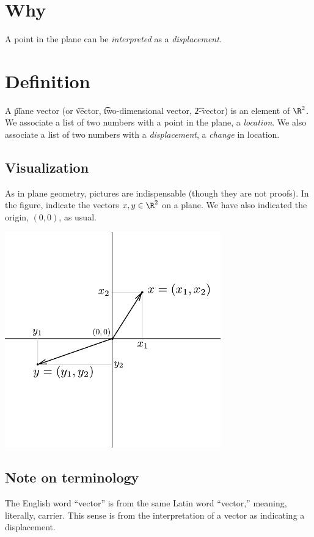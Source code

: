 
\section*{Why}

A point in the plane can be \textit{interpreted} as a \textit{displacement}.

\section*{Definition}

A \t{plane vector} (or \t{vector}, \t{two-dimensional vector}, \t{2-vector}) is an element of $\R ^2$.
We associate a list of two numbers with a point in the plane, a \textit{location}.
We also associate a list of two numbers with a \textit{displacement}, a \textit{change} in location.

\subsection*{Visualization}

As in plane geometry, pictures are indispensable (though they are not proofs).
In the figure, indicate the vectors $x, y \in \R ^2$ on a plane.
We have also indicated the origin, $(0, 0)$, as usual.
\begin{center}  \includegraphics[width=0.70\textwidth]{./graphics/vector_components.pdf}\end{center}

\subsection*{Note on terminology}

The English word ``vector'' is from the same Latin word ``vector,'' meaning, literally, carrier.
This sense is from the interpretation of a vector as indicating a displacement.
